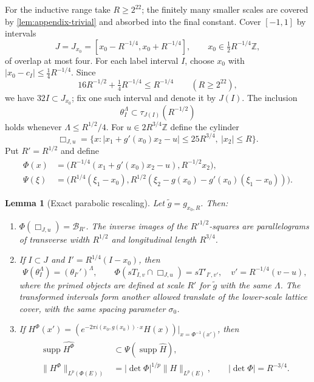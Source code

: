 \documentclass[11pt,letterpaper]{amsart}
\newtheorem{lemma}[lemma]{Lemma}
\newcommand{\supp}{\operatorname{supp}}
\begin{document}
For the inductive range take $R\ge2^{22}$; the finitely many smaller
scales are covered by \cref{lem:appendix-trivial} and absorbed into the final
constant.  Cover $[-1,1]$ by intervals
\[
 J=J_{x_0}=[x_0-R^{-1/4},x_0+R^{-1/4}],
 \qquad x_0\in\tfrac12R^{-1/4}\mathbb Z,
\]
of overlap at most four.  For each label interval $I$, choose $x_0$ with
$|x_0-c_I|\le\tfrac14R^{-1/4}$.  Since
\[
 16R^{-1/2}+\tfrac14R^{-1/4}\le R^{-1/4}
 \qquad(R\ge2^{22}),
\]
we have $32I\subset J_{x_0}$; fix one such interval and denote it by
$J(I)$.
The inclusion
\begin{equation}\label{eq:cap-in-tau}
 \theta_I^\Lambda
 \subset\tau_{J(I)}(R^{-1/2})
\end{equation}
holds whenever $\Lambda\le R^{1/2}/4$.
For $u\in2R^{3/4}\mathbb Z$ define the cylinder
\[
 \Box_{J,u}
 =\{x:|x_1+g'(x_0)x_2-u|\le25R^{3/4},\ |x_2|\le R\}.
\]
Put $R'=R^{1/2}$ and define
\begin{align}
 \Phi(x)
 &=\bigl(R^{-1/4}(x_1+g'(x_0)x_2-u),R^{-1/2}x_2\bigr),
 \label{eq:appendix-Phi}\\
 \Psi(\xi)
 &=\bigl(R^{1/4}(\xi_1-x_0),
 R^{1/2}(\xi_2-g(x_0)-g'(x_0)(\xi_1-x_0))\bigr).
 \label{eq:appendix-Psi}
\end{align}

\begin{lemma}[Exact parabolic rescaling]
\label{lem:appendix-rescaling}
Let $\widetilde g=g_{x_0,R}$.  Then:
\begin{enumerate}[label=\textup{(\alph*)},leftmargin=2em]
\item $\Phi(\Box_{J,u})=\mathcal B_{R'}$.  The inverse images of the
$R'^{1/2}$-squares are parallelograms of transverse width $R^{1/2}$ and
longitudinal length $R^{3/4}$.
\item If $I\subset J$ and $I'=R^{1/4}(I-x_0)$, then
\[
 \Psi(\theta_I^\Lambda)=(\theta_{I'}')^\Lambda,
 \qquad
 \Phi(sT_{I,v}\cap\Box_{J,u})=sT'_{I',v'},
 \quad v'=R^{-1/4}(v-u),
\]
where the primed objects are defined at scale $R'$ for $\widetilde g$ with
the same $\Lambda$.  The transformed intervals form another allowed translate of the
lower-scale lattice cover, with the same spacing parameter $\sigma_0$.
\item If
$H^\Phi(x')=(e^{-2\pi i(x_0,g(x_0))\cdot x}H(x))|_{x=\Phi^{-1}(x')}$,
then
\begin{align*}
 \supp\widehat{H^\Phi}&\subset\Psi(\supp\widehat H),\\
 \|H^\Phi\|_{L^p(\Phi(E))}
 &=|\det\Phi|^{1/p}\|H\|_{L^p(E)},
 \qquad |\det\Phi|=R^{-3/4}.
\end{align*}
\end{enumerate}
\end{lemma}
\end{document}
